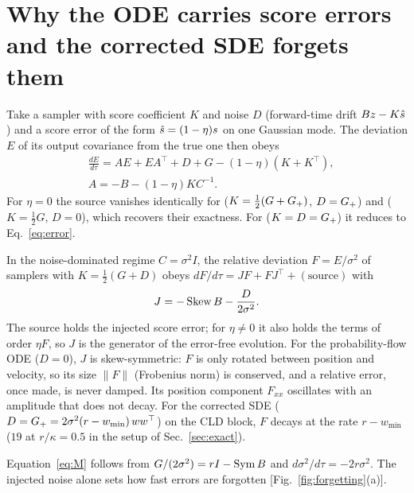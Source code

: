 \section{Why the ODE carries score errors and the corrected SDE forgets them}
\label{sec:forgetting}

Take a sampler with score coefficient $K$ and noise $D$ (forward-time drift $Bz-K\hat s$) and a score error of the form $\hat s=(1-\eta)s$ on one Gaussian mode.
The deviation $E$ of its output covariance from the true one then obeys
\begin{equation}
\begin{aligned}
&\frac{dE}{d\tau}=AE+EA^{\top}+D+G-(1-\eta)(K+K^{\top}),\\
&A=-B-(1-\eta)KC^{-1}.
\end{aligned}
\label{eq:general}
\end{equation}
For $\eta=0$ the source vanishes identically for \Sb{} ($K=\tfrac12(G+G_{+})$, $D=G_{+}$) and \Sc{} ($K=\tfrac12G$, $D=0$), which recovers their exactness.
For \Sa{} ($K=D=G_{+}$) it reduces to Eq.~\eqref{eq:error}.

\begin{derived}
\label{der:forgetting}
In the noise-dominated regime $C=\sigma^2I$, the relative deviation $F=E/\sigma^2$ of samplers with $K=\tfrac12(G+D)$ obeys $dF/d\tau=JF+FJ^{\top}+(\text{source})$ with
\begin{equation}
J=-\operatorname{Skew} B-\frac{D}{2\sigma^2}.
\label{eq:M}
\end{equation}
The source holds the injected score error; for $\eta\neq0$ it also holds the terms of order $\eta F$, so $J$ is the generator of the error-free evolution.
For the probability-flow ODE ($D=0$), $J$ is skew-symmetric: $F$ is only rotated between position and velocity, so its size $\|F\|$ (Frobenius norm) is conserved, and a relative error, once made, is never damped.
Its position component $F_{xx}$ oscillates with an amplitude that does not decay.
For the corrected SDE ($D=G_{+}=2\sigma^2(r-w_{\min})\,ww^{\top}$) on the CLD block, $F$ decays at the rate $r-w_{\min}$ ($19$ at $r/\kappa=0.5$ in the setup of Sec.~\ref{sec:exact}).
\end{derived}
Equation~\eqref{eq:M} follows from $G/(2\sigma^2)=rI-\operatorname{Sym} B$ and $d\sigma^2/d\tau=-2r\sigma^2$.
The injected noise alone sets how fast errors are forgotten [Fig.~\ref{fig:forgetting}(a)].

